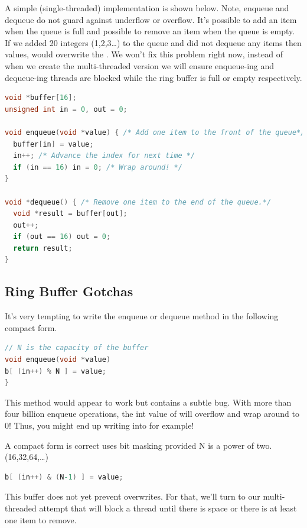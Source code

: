 A simple (single-threaded) implementation is shown below.
Note, enqueue and dequeue do not guard against underflow or overflow.
It's possible to add an item when the queue is full and possible to remove an item when the queue is empty.
If we added 20 integers (1,2,3\ldots{}) to the queue and did not dequeue any items then values,  would overwrite the .
We won't fix this problem right now, instead of when we create the multi-threaded version we will ensure enqueue-ing and dequeue-ing threads are blocked while the ring buffer is full or empty respectively.

\begin{lstlisting}[language=C]
void *buffer[16];
unsigned int in = 0, out = 0;

void enqueue(void *value) { /* Add one item to the front of the queue*/
  buffer[in] = value;
  in++; /* Advance the index for next time */
  if (in == 16) in = 0; /* Wrap around! */
}

void *dequeue() { /* Remove one item to the end of the queue.*/
  void *result = buffer[out];
  out++;
  if (out == 16) out = 0;
  return result;
}
\end{lstlisting}

\subsection{Ring Buffer Gotchas}

It's very tempting to write the enqueue or dequeue method in the following compact form.

\begin{lstlisting}[language=C]
// N is the capacity of the buffer
void enqueue(void *value)
b[ (in++) % N ] = value;
}
\end{lstlisting}

This method would appear to work but contains a subtle bug.
With more than four billion enqueue operations, the int value of  will overflow and wrap around to 0!
Thus, you might end up writing into  for example!

A compact form is correct uses bit masking provided N is a power of two. (16,32,64,\ldots{})

\begin{lstlisting}[language=C]
b[ (in++) & (N-1) ] = value;
\end{lstlisting}

This buffer does not yet prevent overwrites.
For that, we'll turn to our multi-threaded attempt that will block a thread until there is space or there is at least one item to remove.

